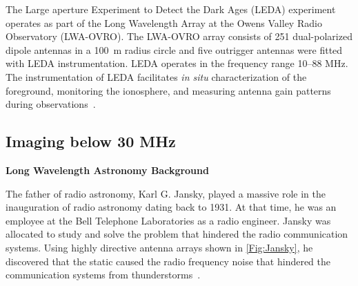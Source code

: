             
	    The Large aperture Experiment to Detect the Dark Ages (LEDA) experiment operates as part of the Long Wavelength Array at the Owens Valley Radio Observatory (LWA-OVRO). The LWA-OVRO array consists of 251 dual-polarized dipole antennas in a \SI{100}{\meter} radius circle and five outrigger antennas were fitted with LEDA instrumentation. LEDA operates in the frequency range 10–88 MHz. The instrumentation of LEDA facilitates \textit{in situ} characterization of the foreground, monitoring the ionosphere, and measuring antenna gain patterns during observations~\citep{2012JAI.....150004T, 2018MNRAS.478.4193P}.
	    	    
	    \subsection{Imaging below 30 MHz}
	    
	    {\bf{Long Wavelength Astronomy Background}}
	    
	    The father of radio astronomy, Karl G. Jansky, played a massive role in the inauguration of radio astronomy dating back to 1931. At that time, he was an employee at the Bell Telephone Laboratories as a radio engineer. Jansky was allocated to study and solve the problem that hindered the radio communication systems. Using highly directive antenna arrays shown in \autoref{Fig:Jansky}, he discovered that the static caused the radio frequency noise that hindered the communication systems from thunderstorms~\citep{book:BasicsofRA, book:RA}.
	    
